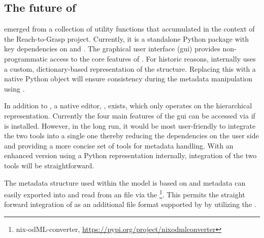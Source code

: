\subsection{The future of }
 emerged from a collection of  utility functions that accumulated in the context of the Reach-to-Grasp project. Currently, it is a standalone Python package with key dependencies on  and . The graphical user interface (gui) provides non-programmatic access to the core features of . For historic reasons,  internally uses a custom, dictionary-based representation of the  structure. Replacing this with a native  Python object will ensure consistency during the metadata manipulation using .

In addition to , a native  editor, , exists, which only operates on the hierarchical  representation. Currently the four main features of the  gui can be accessed via  if  is installed. However, in the long run, it would be most user-friendly to integrate the two tools into a single one thereby reducing the dependencies on the user side and providing a more concise set of tools for metadata handling. With an enhanced  version using a Python  representation internally, integration of the two tools will be straightforward.

The metadata structure used within the  model is based on  and metadata can easily exported into and read from an  file via the \footnote{nix-odML-converter, \url{https://pypi.org/project/nixodmlconverter}}. This permits the straight forward integration of  as an additional file format supported by  by utilizing the .

